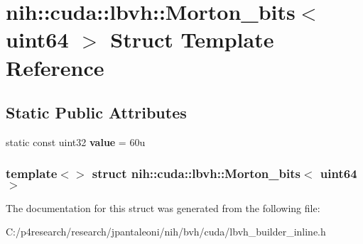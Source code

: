 \hypertarget{structnih_1_1cuda_1_1lbvh_1_1_morton__bits_3_01uint64_01_4}{
\section{nih\-:\-:cuda\-:\-:lbvh\-:\-:\-Morton\-\_\-bits$<$ uint64 $>$ \-Struct \-Template \-Reference}
\label{structnih_1_1cuda_1_1lbvh_1_1_morton__bits_3_01uint64_01_4}
}
\subsection*{\-Static \-Public \-Attributes}
\begin{DoxyCompactItemize}
\item 
\hypertarget{structnih_1_1cuda_1_1lbvh_1_1_morton__bits_3_01uint64_01_4_a1968e6a717daf1efa9201527813b73da}{
static const uint32 {\bfseries value} = 60u}
\label{structnih_1_1cuda_1_1lbvh_1_1_morton__bits_3_01uint64_01_4_a1968e6a717daf1efa9201527813b73da}

\end{DoxyCompactItemize}
\subsubsection*{template$<$$>$ struct nih\-::cuda\-::lbvh\-::\-Morton\-\_\-bits$<$ uint64 $>$}



\-The documentation for this struct was generated from the following file\-:\begin{DoxyCompactItemize}
\item 
\-C\-:/p4research/research/jpantaleoni/nih/bvh/cuda/lbvh\-\_\-builder\-\_\-inline.\-h\end{DoxyCompactItemize}
